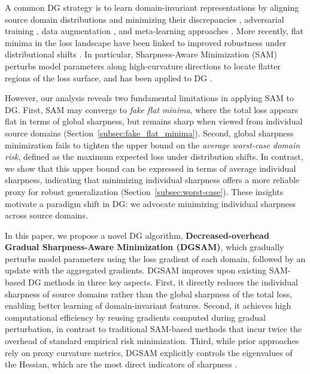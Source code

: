 \documentclass{article}
\theoremstyle{plain}
\theoremstyle{definition}
\theoremstyle{remark}
\begin{document}
A common DG strategy is to learn domain-invariant representations by aligning source domain distributions and minimizing their discrepancies \citep{muandet2013moment1, arjovsky2019irm}, adversarial training \citep{li2018adver1, ganin2016dann}, data augmentation \citep{volpi2018generalizing, zhou2020dataaug4, zhou2021dataaug5}, and meta-learning approaches \citep{li2019meta1, balaji2018metareg}. More recently, flat minima in the loss landscape have been linked to improved robustness under distributional shifts \citep{cha2021swad, zhang2022gasam, chaudhari2019entropy}. In particular, Sharpness-Aware Minimization (SAM) \citep{foret2021sam} perturbs model parameters along high-curvature directions to locate flatter regions of the loss surface, and has been applied to DG \citep{wang2023sagm, shin2024udim, zhang2024disam}.

However, our analysis reveals two fundamental limitations in applying SAM to DG. First, SAM may converge to \textit{fake flat minima}, where the total loss appears flat in terms of global sharpness, but remains sharp when viewed from individual source domains (Section~\ref{subsec:fake_flat_minima}). Second, global sharpness minimization fails to tighten the upper bound on the \emph{average worst-case domain risk}, defined as the maximum expected loss under distribution shifts. In contrast, we show that this upper bound can be expressed in terms of average individual sharpness, indicating that minimizing individual sharpness offers a more reliable proxy for robust generalization (Section~\ref{subsec:worst-case}). These insights motivate a paradigm shift in DG: we advocate minimizing individual sharpness across source domains.

In this paper, we propose a novel DG algorithm, \textbf{Decreased-overhead Gradual Sharpness-Aware Minimization (DGSAM)}, which gradually perturbs model parameters using the loss gradient of each domain, followed by an update with the aggregated gradients. DGSAM improves upon existing SAM-based DG methods in three key aspects.  
First, it directly reduces the individual sharpness of source domains rather than the global sharpness of the total loss, enabling better learning of domain-invariant features.  
Second, it achieves high computational efficiency by reusing gradients computed during gradual perturbation, in contrast to traditional SAM-based methods that incur twice the overhead of standard empirical risk minimization.  
Third, while prior approaches rely on proxy curvature metrics, DGSAM explicitly controls the eigenvalues of the Hessian, which are the most direct indicators of sharpness \citep{keskar2016large, ghorbani2019investigation}.  
\end{document}
